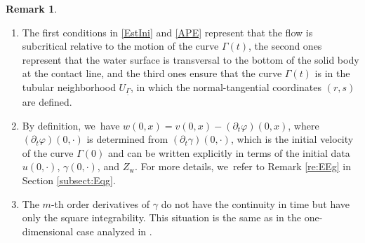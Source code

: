 \documentclass[10pt]{amsart}
\newenvironment{enumeratei}
{\bgroup\def\theenumi{\roman{enumi}}\def\theenumii{\arabic{enumii}}\begin{enumerate}}
{\end{enumerate}\egroup}
\newcommand{\dt}{\partial_t}
\newcommand{\ul}[1]{\underline{#1}}
\newcommand{\itGamma}{\mathit{\Gamma}}
\theoremstyle{definition}
\newtheorem{remark}[theorem]{Remark}
\begin{document}
\skpt
\begin{remark}\label{re:th}
\begin{enumeratei}
\item
The first conditions in \eqref{EstIni} and \eqref{APE} represent that the flow is subcritical relative to the motion of the curve $\itGamma(t)$,
the second ones represent that the water surface is transversal to the bottom of the solid body at the contact line,
and the third ones ensure that the curve $\itGamma(t)$ is in the tubular neighborhood $U_{\ul{\itGamma}}$,
in which the normal-tangential coordinates $(r,s)$ are defined.

\item
By definition, we~have $w(0,x)=v(0,x)-(\dt\varphi)(0,x)$, where $(\dt\varphi)(0,\cdot)$ is determined from $(\dt\gamma)(0,\cdot)$,
which is the initial velocity of the curve $\itGamma(0)$ and can be written explicitly in terms of the initial data
$u(0,\cdot)$, $\gamma(0,\cdot)$, and $Z_\mathrm{w}$.
For more details, we~refer to Remark \ref{re:EEg} in Section \ref{subsect:Eqg}.

\item
The $m$-th order derivatives of $\gamma$ do not have the continuity in time but have only the square integrability.
This situation is the same as in the one-dimensional case analyzed in \cite{IguchiLannes2021}.
\end{enumeratei}
\end{remark}
\end{document}
